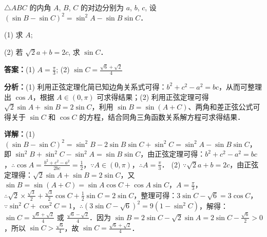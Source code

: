 \begin{question}[points=12]
$\triangle ABC$ 的内角 $A$, $B$, $C$ 的对边分别为 $a$, $b$, $c$, 设 $(\sin B - \sin C)^2 = \sin^2 A - \sin B \sin C$．

(1) 求 $A$;

(2) 若 $\sqrt{2}a + b = 2c$, 求 $\sin C$．
\begin{solution}
\textbf{答案：}(1) $A = \frac{\pi}{3}$; (2) $\sin C = \frac{\sqrt{6} + \sqrt{2}}{4}$

\textbf{分析：}(1) 利用正弦定理化简已知边角关系式可得：$b^2 + c^2 - a^2 = bc$，从而可整理出 $\cos A$，根据 $A \in (0, \pi)$ 可求得结果；(2) 利用正弦定理可得 $\sqrt{2}\sin A + \sin B = 2\sin C$，利用 $\sin B = \sin(A + C)$、两角和差正弦公式可得关于 $\sin C$ 和 $\cos C$ 的方程，结合同角三角函数关系解方程可求得结果．

\textbf{详解：}(1) $(\sin B - \sin C)^2 = \sin^2 B - 2\sin B\sin C + \sin^2 C = \sin^2 A - \sin B\sin C$，即 $\sin^2 B + \sin^2 C - \sin^2 A = \sin B\sin C$，由正弦定理可得：$b^2 + c^2 - a^2 = bc$，$\therefore \cos A = \frac{b^2 + c^2 - a^2}{2bc} = \frac{1}{2}$，$\because A \in (0, \pi)$，$\therefore A = \frac{\pi}{3}$．
(2) $\because \sqrt{2}a + b = 2c$，由正弦定理得：$\sqrt{2}\sin A + \sin B = 2\sin C$，又 $\sin B = \sin(A + C) = \sin A \cos C + \cos A \sin C$，$A = \frac{\pi}{3}$，$\therefore \sqrt{2} \times \frac{\sqrt{3}}{2} + \frac{\sqrt{3}}{2}\cos C + \frac{1}{2}\sin C = 2\sin C$，整理可得：$3\sin C - \sqrt{6} = 3\cos C$，$\because \sin^2 C + \cos^2 C = 1$，$\therefore (3\sin C - \sqrt{6})^2 = 9(1 - \sin^2 C)$，解得：$\sin C = \frac{\sqrt{6} + \sqrt{2}}{4}$ 或 $\frac{\sqrt{6} - \sqrt{2}}{4}$．因为 $\sin B = 2\sin C - \sqrt{2}\sin A = 2\sin C - \frac{\sqrt{6}}{2} > 0$，所以 $\sin C > \frac{\sqrt{6}}{4}$，故 $\sin C = \frac{\sqrt{6} + \sqrt{2}}{4}$．
\end{solution}
\end{question}

